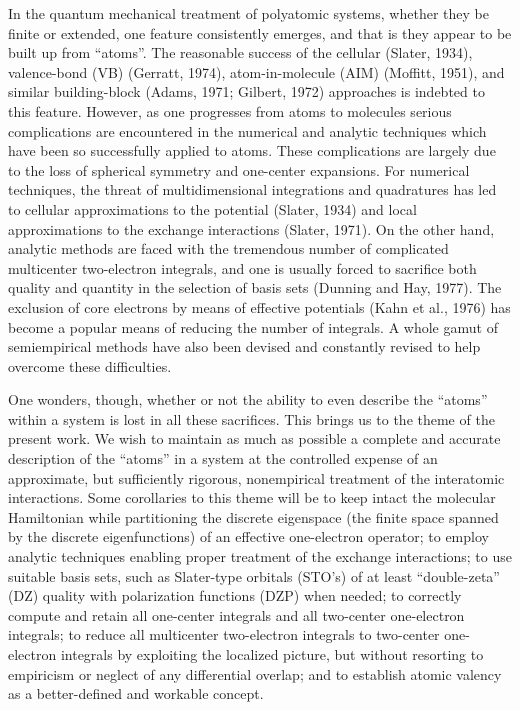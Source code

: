 \documentclass[12pt,letterpaper]{report}
\begin{document}
In the quantum mechanical treatment of polyatomic systems, whether they be finite or extended, one feature consistently emerges, and that is they appear to be built up from ``atoms''. The reasonable success of the cellular (Slater, 1934), valence-bond (VB) (Gerratt, 1974), atom-in-molecule (AIM) (Moffitt, 1951), and similar building-block (Adams, 1971; Gilbert, 1972) approaches is indebted to this feature. However, as one progresses from atoms to molecules serious complications are encountered in the numerical and analytic techniques which have been so successfully applied to atoms. These complications are largely due to the loss of spherical symmetry and one-center expansions. For numerical techniques, the threat of multidimensional integrations and quadratures has led to cellular approximations to the potential (Slater, 1934) and local approximations to the exchange interactions (Slater, 1971). On the other hand, analytic methods are faced with the tremendous number of complicated multicenter two-electron integrals, and one is usually forced to sacrifice both quality and quantity in the selection of basis sets (Dunning and Hay, 1977). The exclusion of core electrons by means of effective potentials (Kahn et al., 1976) has become a popular means of reducing the number of integrals. A whole gamut of semiempirical methods have also been devised and constantly revised to help overcome these difficulties.

One wonders, though, whether or not the ability to even describe the ``atoms'' within a system is lost in all these sacrifices. This brings us to the theme of the present work. We wish to maintain as much as possible a complete and accurate description of the ``atoms'' in a system at the controlled expense of an approximate, but sufficiently rigorous, nonempirical treatment of the interatomic interactions. Some corollaries to this theme will be to keep intact the molecular Hamiltonian while partitioning the discrete eigenspace (the finite space spanned by the discrete eigenfunctions) of an effective one-electron operator; to employ analytic techniques enabling proper treatment of the exchange interactions; to use suitable basis sets, such as Slater-type orbitals (STO's) of at least ``double-zeta'' (DZ) quality with polarization functions (DZP) when needed; to correctly compute and retain all one-center integrals and all two-center one-electron integrals; to reduce all multicenter two-electron integrals to two-center one-electron integrals by exploiting the localized picture, but without resorting to empiricism or neglect of any differential overlap; and to establish atomic valency as a better-defined and workable concept.
\end{document}
